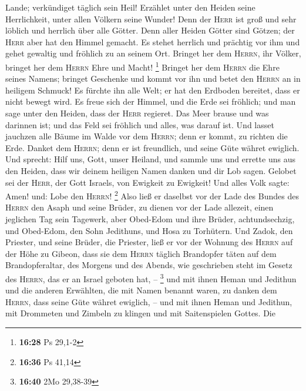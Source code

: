Lande; verkündiget täglich sein Heil!  Erzählet unter den
Heiden seine Herrlichkeit, unter allen Völkern seine Wunder!
 Denn der \textsc{Herr} ist groß und sehr löblich und
herrlich über alle Götter.  Denn aller Heiden Götter sind
Götzen; der \textsc{Herr} aber hat den Himmel gemacht. 
Es stehet herrlich und prächtig vor ihm und gehet gewaltig und fröhlich
zu an seinem Ort.  Bringet her dem \textsc{Herrn}, ihr
Völker, bringet her dem \textsc{Herrn} Ehre und Macht! \footnote{\textbf{16:28}
  Ps 29,1-2}  Bringet her dem \textsc{Herrn} die Ehre
seines Namens; bringet Geschenke und kommt vor ihn und betet den
\textsc{Herrn} an in heiligem Schmuck!  Es fürchte ihn
alle Welt; er hat den Erdboden bereitet, dass er nicht bewegt wird.
 Es freue sich der Himmel, und die Erde sei fröhlich; und
man sage unter den Heiden, dass der \textsc{Herr} regieret.
 Das Meer brause und was darinnen ist; und das Feld sei
fröhlich und alles, was darauf ist.  Und lasset jauchzen
alle Bäume im Walde vor dem \textsc{Herrn}; denn er kommt, zu richten
die Erde.  Danket dem \textsc{Herrn}; denn er ist
freundlich, und seine Güte währet ewiglich.  Und sprecht:
Hilf uns, Gott, unser Heiland, und sammle uns und errette uns aus den
Heiden, dass wir deinem heiligen Namen danken und dir Lob sagen.
 Gelobet sei der \textsc{Herr}, der Gott Israels, von
Ewigkeit zu Ewigkeit! Und alles Volk sagte: Amen! und: Lobe den
\textsc{Herrn}! \footnote{\textbf{16:36} Ps 41,14}  Also
ließ er daselbst vor der Lade des Bundes des \textsc{Herrn} den Asaph
und seine Brüder, zu dienen vor der Lade allezeit, einen jeglichen Tag
sein Tagewerk,  aber Obed-Edom und ihre Brüder,
achtundsechzig, und Obed-Edom, den Sohn Jedithuns, und Hosa zu
Torhütern.  Und Zadok, den Priester, und seine Brüder,
die Priester, ließ er vor der Wohnung des \textsc{Herrn} auf der Höhe zu
Gibeon,  dass sie dem \textsc{Herrn} täglich Brandopfer
täten auf dem Brandopferaltar, des Morgens und des Abends, wie
geschrieben steht im Gesetz des \textsc{Herrn}, das er an Israel geboten
hat, -- \footnote{\textbf{16:40} 2Mo 29,38-39}  und mit
ihnen Heman und Jedithun und die anderen Erwählten, die mit Namen
benannt waren, zu danken dem \textsc{Herrn}, dass seine Güte währet
ewiglich, --  und mit ihnen Heman und Jedithun, mit
Drommeten und Zimbeln zu klingen und mit Saitenspielen Gottes. Die
